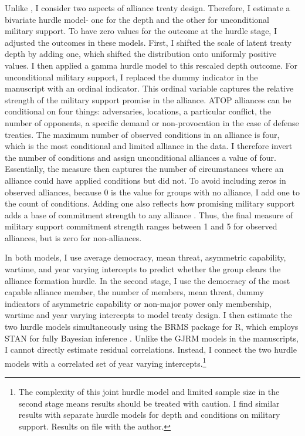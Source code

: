 \documentclass[12pt]{article}
\begin{document}
Unlike \citet{Chibaetal2015}, I consider two aspects of alliance treaty design. 
Therefore, I estimate a bivariate hurdle model- one for the depth and the other for unconditional military support. 
To have zero values for the outcome at the hurdle stage, I adjusted the outcomes in these models. 
First, I shifted the scale of latent treaty depth by adding one, which shifted the distribution onto uniformly positive values. 
I then applied a gamma hurdle model to this rescaled depth outcome.  
For unconditional military support, I replaced the dummy indicator in the manuscript with an ordinal indicator.
This ordinal variable captures the relative strength of the military support promise in the alliance. 
ATOP alliances can be conditional on four things: adversaries, locations, a particular conflict, the number of opponents, a specific demand or non-provocation in the case of defense treaties. 
The maximum number of observed conditions in an alliance is four, which is the most conditional and limited alliance in the data. 
I therefore invert the number of conditions and assign unconditional alliances a value of four. 
Essentially, the measure then captures the number of circumstances where an alliance could have applied conditions but did not. 
To avoid including zeros in observed alliances, because 0 is the value for groups with no alliance, I add one to the count of conditions.
Adding one also reflects how promising military support adds a base of commitment strength to any alliance \citep{Morrow2000}. 
Thus, the final measure of military support commitment strength ranges between 1 and 5 for observed alliances, but is zero for non-alliances. 


In both models, I use average democracy, mean threat, asymmetric capability, wartime, and year varying intercepts to predict whether the group clears the alliance formation hurdle.
In the second stage, I use the democracy of the most capable alliance member, the number of members, mean threat, dummy indicators of asymmetric capability or non-major power only membership, wartime and year varying intercepts to model treaty design. 
I then estimate the two hurdle models simultaneously using the BRMS package for \textsf{R}, which employs STAN for fully Bayesian inference \citep{Buerkner2017}. 
Unlike the GJRM models in the manuscripts, I cannot directly estimate residual correlations.
Instead, I connect the two hurdle models with a correlated set of year varying intercepts.\footnote{The complexity of this joint hurdle model and limited sample size in the second stage means results should be treated with caution. I find similar results with separate hurdle models for depth and conditions on military support. Results on file with the author.} 
\end{document}
